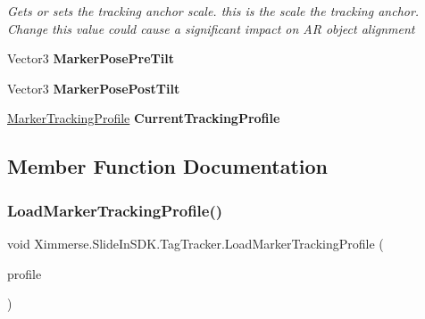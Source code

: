 \begin{DoxyCompactItemize}
\begin{DoxyCompactList}\small\item\em Gets or sets the tracking anchor scale. this is the scale the tracking anchor. Change this value could cause a significant impact on AR object alignment \end{DoxyCompactList}\item 
\mbox{\label{class_ximmerse_1_1_slide_in_s_d_k_1_1_tag_tracker_ad5236db2fd6f908645c17fb8ece2783a}} 
Vector3 {\bfseries Marker\+Pose\+Pre\+Tilt}
\item 
\mbox{\label{class_ximmerse_1_1_slide_in_s_d_k_1_1_tag_tracker_abfb32ac345abc398c8b035e4093be438}} 
Vector3 {\bfseries Marker\+Pose\+Post\+Tilt}
\item 
\mbox{\label{class_ximmerse_1_1_slide_in_s_d_k_1_1_tag_tracker_a76ddf9449012946385ceb09f68012a4f}} 
\mbox{\hyperlink{class_ximmerse_1_1_slide_in_s_d_k_1_1_marker_tracking_profile}{Marker\+Tracking\+Profile}} {\bfseries Current\+Tracking\+Profile}
\end{DoxyCompactItemize}


\subsection{Member Function Documentation}
\mbox{\label{class_ximmerse_1_1_slide_in_s_d_k_1_1_tag_tracker_a80e7bd639c0ea90a79cb41a30b0604c5}} 
\subsubsection{\texorpdfstring{Load\+Marker\+Tracking\+Profile()}{LoadMarkerTrackingProfile()}}
{\footnotesize\ttfamily void Ximmerse.\+Slide\+In\+S\+D\+K.\+Tag\+Tracker.\+Load\+Marker\+Tracking\+Profile (\begin{DoxyParamCaption}\item[{\mbox{\hyperlink{class_ximmerse_1_1_slide_in_s_d_k_1_1_marker_tracking_profile}{Marker\+Tracking\+Profile}}}]{profile }\end{DoxyParamCaption})}


